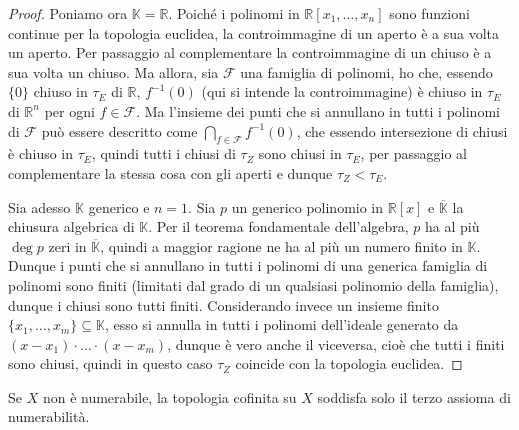 \begin{proof}
	Poniamo ora $\mathbb{K}=\mathbb{R}$. Poiché i polinomi in $\mathbb{R}[x_1,
	\dots, x_n]$ sono funzioni continue per la topologia euclidea, la
	controimmagine di un aperto è a sua volta un aperto. Per passaggio al
	complementare la controimmagine di un chiuso è a sua volta un chiuso. Ma
	allora, sia $\mathcal{F}$ una famiglia di polinomi, ho che, essendo $\{ 0
	\}$ chiuso in $\tau_E$ di $\mathbb{R}$, $f^{-1}(0)$ (qui si intende la
	controimmagine) è chiuso in $\tau_E$ di $\mathbb{R}^n$ per ogni $f \in
	\mathcal{F}$. Ma l'insieme dei punti che si annullano in tutti i polinomi di
	$\mathcal{F}$ può essere descritto come $\displaystyle \bigcap_{f \in
	\mathcal{F}} f^{-1}(0)$, che essendo intersezione di chiusi è chiuso in
	$\tau_E$, quindi tutti i chiusi di $\tau_Z$ sono chiusi in $\tau_E$, per
	passaggio al complementare la stessa cosa con gli aperti e dunque $\tau_Z <
	\tau_E$.

	Sia adesso $\mathbb{K}$ generico e $n=1$. Sia $p$ un generico polinomio in
	$\mathbb{R}[x]$ e $\overline{\mathbb{K}}$ la chiusura algebrica di
	$\mathbb{K}$. Per il teorema fondamentale dell'algebra, $p$ ha al più
	$\deg{p}$ zeri in $\overline{\mathbb{K}}$, quindi a maggior ragione ne ha al
	più un numero finito in $\mathbb{K}$. Dunque i punti che si annullano in
	tutti i polinomi di una generica famiglia di polinomi sono finiti (limitati
	dal grado di un qualsiasi polinomio della famiglia), dunque i chiusi sono
	tutti finiti.
	Considerando invece un insieme finito $\{ x_1, \dots, x_m\} \subseteq
	\mathbb{K}$, esso si annulla in tutti i polinomi dell'ideale generato da
	$(x-x_1) \cdot \ldots \cdot (x-x_m)$, dunque è vero anche il viceversa, cioè
	che tutti i finiti sono chiusi, quindi in questo caso $\tau_Z$ coincide con
	la topologia euclidea.
\end{proof}

\begin{ftt}
	Se $X$ non è numerabile, la topologia cofinita su $X$ soddisfa solo il terzo assioma di numerabilità.
\end{ftt}

